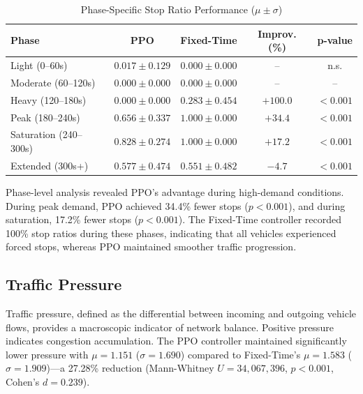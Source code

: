 \documentclass[11pt, a4paper]{report}
\begin{document}
\begin{table}[htbp]
\centering
\caption{Phase-Specific Stop Ratio Performance ($\mu \pm \sigma$)}
\label{tab:stop_phases}
\begin{tabular}{lcccc}
\toprule
\textbf{Phase} & \textbf{PPO} & \textbf{Fixed-Time} & \textbf{Improv. (\%)} & \textbf{p-value} \\
\midrule
Light (0--60s) & $0.017 \pm 0.129$ & $0.000 \pm 0.000$ & -- & n.s. \\
Moderate (60--120s) & $0.000 \pm 0.000$ & $0.000 \pm 0.000$ & -- & -- \\
Heavy (120--180s) & $0.000 \pm 0.000$ & $0.283 \pm 0.454$ & $+100.0$ & $<0.001$ \\
Peak (180--240s) & $0.656 \pm 0.337$ & $1.000 \pm 0.000$ & $+34.4$ & $<0.001$ \\
Saturation (240--300s) & $0.828 \pm 0.274$ & $1.000 \pm 0.000$ & $+17.2$ & $<0.001$ \\
Extended (300s+) & $0.577 \pm 0.474$ & $0.551 \pm 0.482$ & $-4.7$ & $<0.001$ \\
\bottomrule
\end{tabular}
\end{table}

Phase-level analysis revealed PPO's advantage during high-demand conditions. During peak demand, PPO achieved 34.4\% fewer stops ($p < 0.001$), and during saturation, 17.2\% fewer stops ($p < 0.001$). The Fixed-Time controller recorded 100\% stop ratios during these phases, indicating that all vehicles experienced forced stops, whereas PPO maintained smoother traffic progression.

\subsection{Traffic Pressure}

Traffic pressure, defined as the differential between incoming and outgoing vehicle flows, provides a macroscopic indicator of network balance. Positive pressure indicates congestion accumulation. The PPO controller maintained significantly lower pressure with $\mu = 1.151$ ($\sigma = 1.690$) compared to Fixed-Time's $\mu = 1.583$ ($\sigma = 1.909$)---a 27.28\% reduction (Mann-Whitney $U = 34,067,396$, $p < 0.001$, Cohen's $d = 0.239$).
\end{document}
